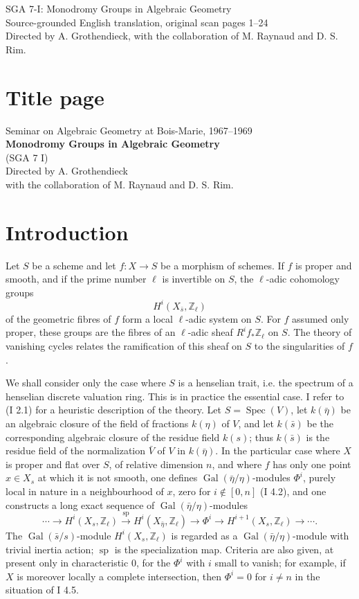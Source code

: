 \documentclass[11pt]{article}
\providecommand{\Spec}{\operatorname{Spec}}
\providecommand{\Gal}{\operatorname{Gal}}
\providecommand{\Zl}{\mathbb Z_\ell}
\begin{document}
\begin{center}
{\Large SGA 7-I: Monodromy Groups in Algebraic Geometry}\\[0.4em]
{\large Source-grounded English translation, original scan pages 1--24}\\[0.4em]
Directed by A. Grothendieck, with the collaboration of M. Raynaud and D. S. Rim.
\end{center}

\section*{Title page}
\begin{center}
Seminar on Algebraic Geometry at Bois-Marie, 1967--1969\\[0.3em]
\textbf{Monodromy Groups in Algebraic Geometry}\\
(SGA 7 I)\\[0.8em]
Directed by A. Grothendieck\\
with the collaboration of M. Raynaud and D. S. Rim.
\end{center}

\section*{Introduction}
Let $S$ be a scheme and let $f:X\to S$ be a morphism of schemes. If $f$ is proper and smooth, and if the prime number $\ell$ is invertible on $S$, the $\ell$-adic cohomology groups
\[
 H^i(X_{\bar s},\Zl)
\]
of the geometric fibres of $f$ form a local $\ell$-adic system on $S$. For $f$ assumed only proper, these groups are the fibres of an $\ell$-adic sheaf $R^if_*\Zl$ on $S$. The theory of vanishing cycles relates the ramification of this sheaf on $S$ to the singularities of $f$.

We shall consider only the case where $S$ is a henselian trait, i.e. the spectrum of a henselian discrete valuation ring. This is in practice the essential case. I refer to (I 2.1) for a heuristic description of the theory. Let $S=\Spec(V)$, let $k(\bar\eta)$ be an algebraic closure of the field of fractions $k(\eta)$ of $V$, and let $k(\bar s)$ be the corresponding algebraic closure of the residue field $k(s)$; thus $k(\bar s)$ is the residue field of the normalization $\bar V$ of $V$ in $k(\bar\eta)$. In the particular case where $X$ is proper and flat over $S$, of relative dimension $n$, and where $f$ has only one point $x\in X_s$ at which it is not smooth, one defines $\Gal(\bar\eta/\eta)$-modules $\Phi^i$, purely local in nature in a neighbourhood of $x$, zero for $i\notin[0,n]$ (I 4.2), and one constructs a long exact sequence of $\Gal(\bar\eta/\eta)$-modules
\[
 \cdots\longrightarrow H^i(X_s,\Zl)\xrightarrow{\operatorname{sp}}
 H^i(X_{\bar\eta},\Zl)\longrightarrow \Phi^i\longrightarrow
 H^{i+1}(X_s,\Zl)\longrightarrow\cdots .
\]
The $\Gal(\bar s/s)$-module $H^i(X_s,\Zl)$ is regarded as a $\Gal(\bar\eta/\eta)$-module with trivial inertia action; $\operatorname{sp}$ is the specialization map. Criteria are also given, at present only in characteristic $0$, for the $\Phi^i$ with $i$ small to vanish; for example, if $X$ is moreover locally a complete intersection, then $\Phi^i=0$ for $i\ne n$ in the situation of I 4.5.
\end{document}
